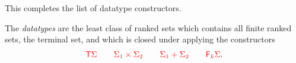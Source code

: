 
 
%
%






\smallskip
\newcommand{\funcitem}[3]{\ranked{#1  } &:& \ranked{#2} \rto  \ranked{#3}}

 This completes the list of  datatype constructors.  
 \begin{definition}[Datatypes]
    \label{def:types}  
        The \emph{datatypes} are the least class of ranked sets which contains all finite ranked sets, the terminal set, and which is closed under applying the constructors 
        \begin{align*}
        {\color{red}{{\color{red}{\mathsf T}}{\color{red}{\Sigma}}\qquad {\color{red}{\Sigma}}_1 \times{\color{red}{\Sigma}}_2 \qquad {\color{red}{\Sigma}}_1 + {\color{red}{\Sigma}}_2 \qquad {\color{red}{\mathsf F_{k}}}{\color{red}{\Sigma}}}}.
        \end{align*}
            \end{definition}


